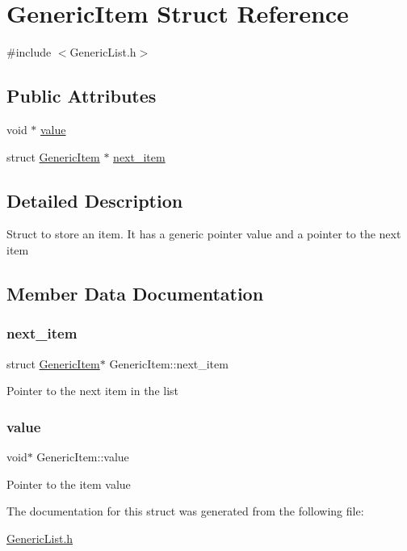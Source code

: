 \hypertarget{structGenericItem}{}\section{Generic\+Item Struct Reference}
\label{structGenericItem}


{\ttfamily \#include $<$Generic\+List.\+h$>$}

\subsection*{Public Attributes}
\begin{DoxyCompactItemize}
\item 
void $\ast$ \mbox{\hyperlink{structGenericItem_a292cf48b44c9f57e518198387525eb33}{value}}
\item 
struct \mbox{\hyperlink{structGenericItem}{Generic\+Item}} $\ast$ \mbox{\hyperlink{structGenericItem_a1b98ceb4a61ebe94fcc3d85fb5c7d765}{next\+\_\+item}}
\end{DoxyCompactItemize}


\subsection{Detailed Description}
Struct to store an item. It has a generic pointer value and a pointer to the next item 

\subsection{Member Data Documentation}
\mbox{\label{structGenericItem_a1b98ceb4a61ebe94fcc3d85fb5c7d765}} 
\subsubsection{\texorpdfstring{next\+\_\+item}{next\_item}}
{\footnotesize\ttfamily struct \mbox{\hyperlink{structGenericItem}{Generic\+Item}}$\ast$ Generic\+Item\+::next\+\_\+item}

Pointer to the next item in the list \mbox{\label{structGenericItem_a292cf48b44c9f57e518198387525eb33}} 
\subsubsection{\texorpdfstring{value}{value}}
{\footnotesize\ttfamily void$\ast$ Generic\+Item\+::value}

Pointer to the item value 

The documentation for this struct was generated from the following file\+:\begin{DoxyCompactItemize}
\item 
\mbox{\hyperlink{GenericList_8h}{Generic\+List.\+h}}\end{DoxyCompactItemize}
